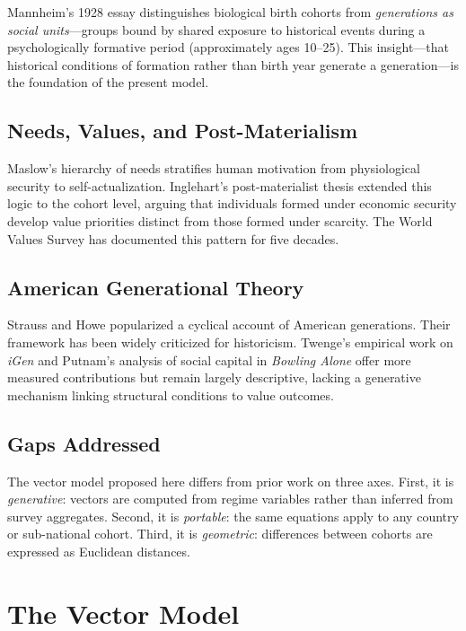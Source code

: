\documentclass[conference]{IEEEtran}
\begin{document}
Mannheim's 1928 essay \cite{mannheim1928} distinguishes biological birth cohorts from \textit{generations as social units}—groups bound by shared exposure to historical events during a psychologically formative period (approximately ages 10--25). This insight—that historical conditions of formation rather than birth year generate a generation—is the foundation of the present model.

\subsection{Needs, Values, and Post-Materialism}

Maslow's hierarchy of needs \cite{maslow1943} stratifies human motivation from physiological security to self-actualization. Inglehart's post-materialist thesis \cite{inglehart1977} extended this logic to the cohort level, arguing that individuals formed under economic security develop value priorities distinct from those formed under scarcity. The World Values Survey \cite{wvs2022} has documented this pattern for five decades.

\subsection{American Generational Theory}

Strauss and Howe \cite{strauss1991} popularized a cyclical account of American generations. Their framework has been widely criticized for historicism. Twenge's empirical work on \textit{iGen} \cite{twenge2017} and Putnam's analysis of social capital in \textit{Bowling Alone} \cite{putnam2000} offer more measured contributions but remain largely descriptive, lacking a generative mechanism linking structural conditions to value outcomes.

\subsection{Gaps Addressed}

The vector model proposed here differs from prior work on three axes. First, it is \textit{generative}: vectors are computed from regime variables rather than inferred from survey aggregates. Second, it is \textit{portable}: the same equations apply to any country or sub-national cohort. Third, it is \textit{geometric}: differences between cohorts are expressed as Euclidean distances.

\section{The Vector Model}
\label{sec:model}
\end{document}
